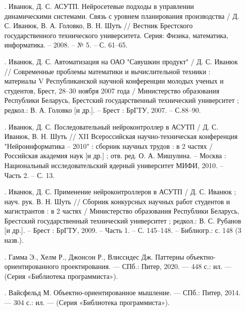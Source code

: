 {\begin{itemize}[leftmargin=2.15cm, labelwidth=0.65cm, labelsep=0.0cm]
    \item[\theimagecntr.] Иванюк, Д. С. АСУТП. Нейросетевые подходы в управлении динамическими системами. Связь с уровнем планирования производства / Д. С. Иванюк, В. А. Головко, В. Н. Шуть // Вестник Брестского государственного технического университета. Серия: Физика, математика, информатика. {--} 2008. {--} № 5. {--} С. 61–65.
    \addtocounter{imagecntr}{1}
    
    \item[\theimagecntr.] Иванюк, Д. С. Автоматизация на ОАО "Савушкин продукт" / Д. С. Иванюк // Современные проблемы математики и вычислительной техники : материалы V Республиканской научной конференции молодых ученых и студентов, Брест, 28–30 ноября 2007 года / Министерство образования Республики Беларусь, Брестский государственный технический университет ; редкол.: В. А. Головко [и др.]. {--} Брест : БрГТУ, 2007. {--} С.88–90.
    \addtocounter{imagecntr}{1}
    
    \item[\theimagecntr.] Иванюк, Д. С. Последовательный нейроконтроллер в АСУТП / Д. С. Иванюк, В. Н. Шуть // XII Всероссийская научно-техническая конференция "Нейроинформатика {--} 2010" : сборник научных трудов : в 2 частях / Российская академия наук [и др.] ; отв. ред. О. А. Мишулина. {--} Москва : Национальный исследовательский ядерный университет МИФИ, 2010. {--} Часть 2. {--} С. 13.
    \addtocounter{imagecntr}{1}
    
    \item[\theimagecntr.] Иванюк, Д. С. Применение нейроконтроллеров в АСУТП / Д. С. Иванюк ; науч. рук. В. Н. Шуть // Сборник конкурсных научных работ студентов и магистрантов : в 2 частях / Министерство образования Республики Беларусь, Брестский государственный технический университет ; редкол.: В. С. Рубанов [и др.]. {--} Брест : БрГТУ, 2009. {--} Часть 1. {--} С. 145–148. {--} Библиогр.: с. 148 (3 назв.).
    \addtocounter{imagecntr}{1}
    
    
    \item[\theimagecntr.] Гамма Э., Хелм Р., Джонсон Р., Влиссидес Дж. Паттерны объектно- ориентированного проектирования. — СПб.: Питер, 2020. — 448 с.: ил. — (Серия «Библиотека программиста»).
    \addtocounter{imagecntr}{1}
   
    
    \item[\theimagecntr.] Вайсфельд М. Объектно-ориентированное мышление. — СПб.: Питер, 2014. — 304 с.: ил. —
    (Серия «Библиотека программиста»).
    \addtocounter{imagecntr}{1}
    

\end{itemize}}
